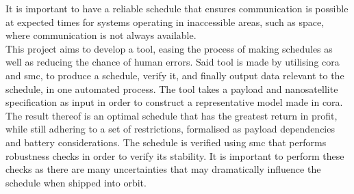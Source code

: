 It is important to have a reliable schedule that ensures communication is possible at expected times for systems operating in inaccessible areas, such as space, where communication is not always available.\\
This project aims to develop a tool, easing the process of making schedules as well as reducing the chance of human errors.
Said tool is made by utilising \acrshort{cora} and \acrshort{smc}, to produce a schedule, verify it, and finally output data relevant to the schedule, in one automated process.
The tool takes a payload and nanosatellite specification as input in order to construct a representative model made in \acrshort{cora}.
The result thereof is an optimal schedule that has the greatest return in profit, while still adhering to a set of restrictions, formalised as payload dependencies and battery considerations.
The schedule is verified using \acrshort{smc} that performs robustness checks in order to verify its stability.
It is important to perform these checks as there are many uncertainties that may dramatically influence the schedule when shipped into orbit.
\glsresetall
